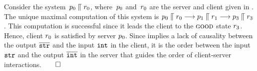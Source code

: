 \begin{example}
\label{ex:max-comp}
 Consider the system~$p_0  \mathrel{\llceil}  r_0$, where~$p_0$
  and~$r_0$ are the server and client given in
  . The unique maximal computation of this system is
  $p_0  \mathrel{\llceil}  r_0 \mathrel{\overset{}\longrightarrow} p_1  \mathrel{\llceil}  r_1
  \mathrel{\overset{}\longrightarrow} p_3  \mathrel{\llceil}  r_3$.
This computation is successful since it leads the client to the $\textsc{good}$ state
$r_3$.
Hence, client  $r_0$ is
satisfied by server $p_0$.
%
Since \outputcommutativity implies a lack of causality
between the output $\overline{{\tt str}}$ and the input ${\tt int}$ in the
client, it is the order between the input ${\tt str}$ and the output
$\overline{\tt int}$ in the server that guides the order of client-server
interactions.\hfill$\qed$
\end{example}





